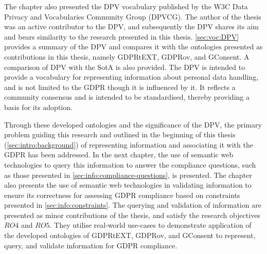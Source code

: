 The chapter also presented the DPV vocabulary published by the W3C Data Privacy and Vocabularies Community Group (DPVCG). The author of the thesis was an active contributor to the DPV, and subsequently the DPV shares its aim and bears similarity to the research presented in this thesis. \autoref{sec:voc:DPV} provides a summary of the DPV and compares it with the ontologies presented as contributions in this thesis, namely GDPRtEXT, GDPRov, and GConsent. A comparison of DPV with the SotA is also provided.
The DPV is intended to provide a vocabulary for representing information about personal data handling, and is not limited to the GDPR though it is influenced by it. It reflects a community consensus and is intended to be standardised, thereby providing a basis for its adoption.

Through these developed ontologies and the significance of the DPV, the primary problem guiding this research and outlined in the beginning of this thesis (\autoref{sec:intro:background}) of representing information and associating it with the GDPR has been addressed.
In the next chapter, the use of semantic web technologies to query this information to answer the compliance questions, such as those presented in \autoref{sec:info:compliance-questions}, is presented. The chapter also presents the use of semantic web technologies in validating information to ensure its correctness for assessing GDPR compliance based on constraints presented in \autoref{sec:info:constraints}.
The querying and validation of information are presented as minor contributions of the thesis, and satisfy the research objectives $RO4$ and $RO5$.
They utilise real-world use-cases to demonstrate application of the developed ontologies of GDPRtEXT, GDPRov, and GConsent to represent, query, and validate information for GDPR compliance.
